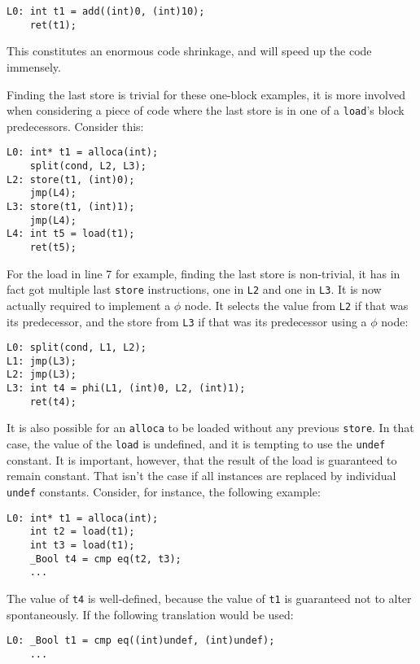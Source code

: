 \documentclass[12pt, a4paper]{article}
\begin{document}
\begin{lstlisting}
L0:	int t1 = add((int)0, (int)10);
	ret(t1);
\end{lstlisting}

This constitutes an enormous code shrinkage, and will speed up the code 
immensely.

Finding the last store is trivial for these one-block examples, it is more 
involved when considering a piece of code where the last store is in one of a 
\verb+load+'s block predecessors. Consider this:

\begin{lstlisting}
L0:	int* t1 = alloca(int);
	split(cond, L2, L3);
L2:	store(t1, (int)0);
	jmp(L4);
L3:	store(t1, (int)1);
	jmp(L4);
L4:	int t5 = load(t1);
	ret(t5);
\end{lstlisting}

For the load in line 7 for example, finding the last store is non-trivial, it 
has in fact got multiple last \verb+store+ instructions, one in \verb+L2+ and one in 
\verb+L3+. It is now actually required to implement a  $\phi$ node. It selects 
the value from \verb+L2+ if that was its predecessor, and the store from \verb+L3+ if 
that was its predecessor using a $\phi$ node:

\begin{lstlisting}
L0:	split(cond, L1, L2);
L1:	jmp(L3);
L2:	jmp(L3);
L3:	int t4 = phi(L1, (int)0, L2, (int)1);
	ret(t4);
\end{lstlisting}

It is also possible for an \verb+alloca+ to be loaded without any previous 
\verb+store+. In that case, the value of the \verb+load+ is undefined, and it is 
tempting to use the \verb+undef+ constant. It is important, however, that the 
result of the load is guaranteed to remain constant. That isn't the case if all 
instances are replaced by individual \verb+undef+ constants. Consider, for 
instance, the following example:

\begin{lstlisting}
L0:	int* t1 = alloca(int);
	int t2 = load(t1);
	int t3 = load(t1);
	_Bool t4 = cmp eq(t2, t3);
	...
\end{lstlisting}

The value of \verb+t4+ is well-defined, because the value of \verb+t1+ is
guaranteed not to alter spontaneously. If the following translation would be 
used:

\begin{lstlisting}
L0:	_Bool t1 = cmp eq((int)undef, (int)undef);
	...
\end{lstlisting}
\end{document}
